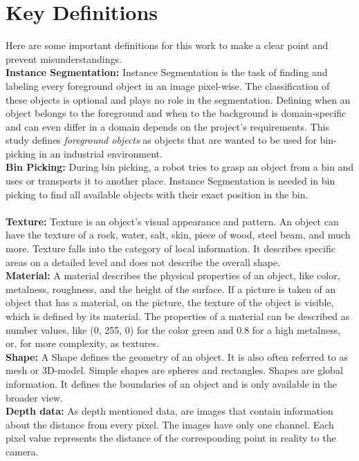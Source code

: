 	\section{Key Definitions}
	\label{sec:key-definitions}
		Here are some important definitions for this work to make a clear point and prevent misunderstandings.\\
		\textbf{Instance Segmentation:} Instance Segmentation is the task of finding and labeling every foreground object in an image pixel-wise. The classification of these objects is optional and plays no role in the segmentation. Defining when an object belongs to the foreground and when to the background is domain-specific and can even differ in a domain depends on the project's requirements. This study defines \textit{foreground objects} as objects that are wanted to be used for bin-picking in an industrial environment.\\ %
		\textbf{Bin Picking:} During bin picking, a robot tries to grasp an object from a bin and uses or transports it to another place. Instance Segmentation is needed in bin picking to find all available objects with their exact position in the bin.\\
		\\
		\textbf{Texture:} Texture is an object's visual appearance and pattern. An object can have the texture of a rock, water, salt, skin, piece of wood, steel beam, and much more. Texture falls into the category of local information. It describes specific areas on a detailed level and does not describe the overall shape.\\
		\textbf{Material:} A material describes the physical properties of an object, like color, metalness, roughness, and the height of the surface. If a picture is taken of an object that has a material, on the picture, the texture of the object is visible, which is defined by its material. The properties of a material can be described as number values, like (0, 255, 0) for the color green and 0.8 for a high metalness, or, for more complexity, as textures.\\
		\textbf{Shape:} A Shape defines the geometry of an object. It is also often referred to as mesh or 3D-model. Simple shapes are spheres and rectangles. Shapes are global information. It defines the boundaries of an object and is only available in the broader view.\\
		\textbf{Depth data:} As depth mentioned data, are images that contain information about the distance from every pixel. The images have only one channel. Each pixel value represents the distance of the corresponding point in reality to the camera.\\
